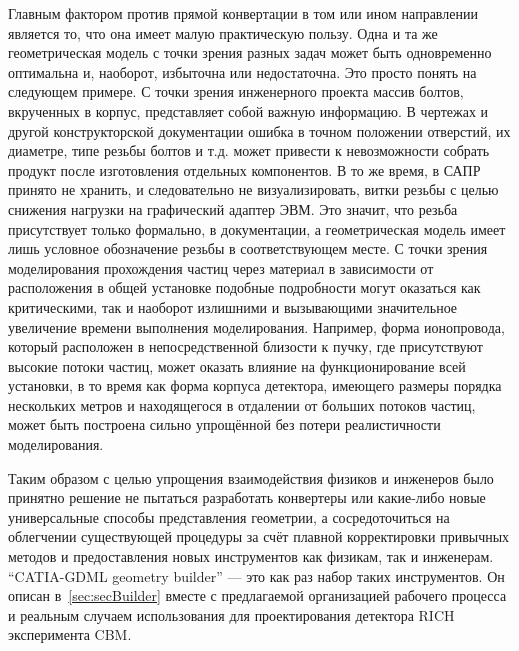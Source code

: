 Главным фактором против прямой конвертации в том или ином направлении является то, что она имеет малую практическую пользу. Одна и та же геометрическая модель с точки зрения разных задач может быть одновременно оптимальна и, наоборот, избыточна или недостаточна. Это просто понять на следующем примере. С точки зрения инженерного проекта массив болтов, вкрученных в корпус, представляет собой важную информацию. В чертежах и другой конструкторской документации ошибка в точном положении отверстий, их диаметре, типе резьбы болтов и т.д. может привести к невозможности собрать продукт после изготовления отдельных компонентов. В то же время, в САПР принято не хранить, и следовательно не визуализировать, витки резьбы с целью снижения нагрузки на графический адаптер ЭВМ. Это значит, что резьба присутствует только формально, в документации, а геометрическая модель имеет лишь условное обозначение резьбы в соответствующем месте. С точки зрения моделирования прохождения частиц через материал в зависимости от расположения в общей установке подобные подробности могут оказаться как критическими, так и наоборот излишними и вызывающими значительное увеличение времени выполнения моделирования.
Например, форма ионопровода, который расположен в непосредственной близости к пучку, где присутствуют высокие потоки частиц, может оказать влияние на функционирование всей установки, в то время как форма корпуса детектора, имеющего размеры порядка нескольких метров и находящегося в отдалении от больших потоков частиц, может быть построена сильно упрощённой без потери реалистичности моделирования.

Таким образом с целью упрощения взаимодействия физиков и инженеров было принятно решение не пытаться разработать конвертеры или какие-либо новые универсальные способы представления геометрии, а сосредоточиться на облегчении существующей процедуры за счёт плавной корректировки привычных методов и предоставления новых инструментов как физикам, так и инженерам. ``CATIA-GDML geometry builder'' --- это как раз набор таких инструментов. Он описан в~\ref{sec:secBuilder} вместе с предлагаемой организацией рабочего процесса и реальным случаем использования для проектирования детектора RICH эксперимента CBM.
